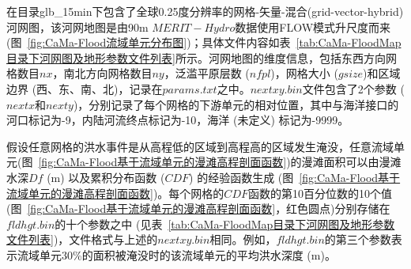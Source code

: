 在目录glb\_15min下包含了全球0.25度分辨率的网格-矢量-混合(grid-vector-hybrid)河网图，该河网地图是由90m $MERIT-Hydro$数据使用FLOW模式升尺度而来 (图~\ref{fig:CaMa-Flood流域单元分布图})；具体文件内容如表~\ref{tab:CaMa-FloodMap目录下河网图及地形参数文件列表}所示。河网地图的维度信息，包括东西方向网格数目$nx$，南北方向网格数目$ny$，泛滥平原层数 ($nfpl$)，网格大小 ($gsize$)和区域边界 (西、东、南、北)，记录在$params.txt$之中。$nextxy.bin$文件包含了2个参数 ($nextx$和$nexty$)，分别记录了每个网格的下游单元的相对位置，其中与海洋接口的河口标记为-9，内陆河流终点标记为-10，海洋 (未定义) 标记为-9999。


假设任意网格的洪水事件是从高程低的区域到高程高的区域发生淹没，任意流域单元(图~\ref{fig:CaMa-Flood基于流域单元的漫滩高程剖面函数})的漫滩面积可以由漫滩水深$Df$ (m) 以及累积分布函数 ($CDF$) 的经验函数生成 (图~\ref{fig:CaMa-Flood基于流域单元的漫滩高程剖面函数})。每个网格的$CDF$函数的第10百分位数的10个值 (图~\ref{fig:CaMa-Flood基于流域单元的漫滩高程剖面函数}，红色圆点)分别存储在$fldhgt.bin$的十个参数之中 (见表~\ref{tab:CaMa-FloodMap目录下河网图及地形参数文件列表})，文件格式与上述的$nextxy.bin$相同。例如，$fldhgt.bin$的第三个参数表示流域单元30\%的面积被淹没时的该流域单元的平均洪水深度 (m)。 


